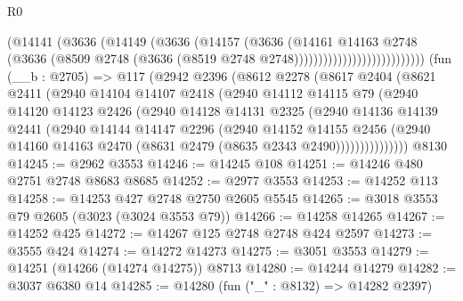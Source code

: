 \begin{lexlean}{R0}
\begin{coremodule}
                                    (@14141
                                      (@3636
                                        (@14149
                                          (@3636
                                            (@14157
                                              (@3636
                                                (@14161
                                                  @14163
                                                  @2748
                                                  (@3636
                                                    (@8509
                                                      @2748
                                                      (@3636
                                                        (@8519
                                                          @2748
                                                          @2748)))))))))))))))))))))))))))
    (fun (__b : @2705) =>
    @117
      (@2942
        @2396
        (@8612
          @2278
          (@8617
            @2404
            (@8621
              @2411
              (@2940
                @14104
                @14107
                @2418
                (@2940
                  @14112
                  @14115
                  @79
                  (@2940
                    @14120
                    @14123
                    @2426
                    (@2940
                      @14128
                      @14131
                      @2325
                      (@2940
                        @14136
                        @14139
                        @2441
                        (@2940
                          @14144
                          @14147
                          @2296
                          (@2940
                            @14152
                            @14155
                            @2456
                            (@2940
                              @14160
                              @14163
                              @2470
                              (@8631 @2479 (@8635 @2343 @2490)))))))))))))))
    @8130
@14245 := @2962 @3553
@14246 := @14245 @108
@14251 := @14246 @480 @2751 @2748 @8683 @8685
@14252 := @2977 @3553
@14253 := @14252 @113
@14258 := @14253 @427 @2748 @2750 @2605 @5545
@14265 := @3018 @3553 @79 @2605 (@3023 (@3024 @3553 @79))
@14266 := @14258 @14265
@14267 := @14252 @425
@14272 := @14267 @125 @2748 @2748 @424 @2597
@14273 := @3555 @424
@14274 := @14272 @14273
@14275 := @3051 @3553
@14279 := @14251 (@14266 (@14274 @14275)) @8713
@14280 := @14244 @14279
@14282 := @3037 @6380 @14
@14285 := @14280 (fun ("_" : @8132) => @14282 @2397)

\end{coremodule}
\end{lexlean}
